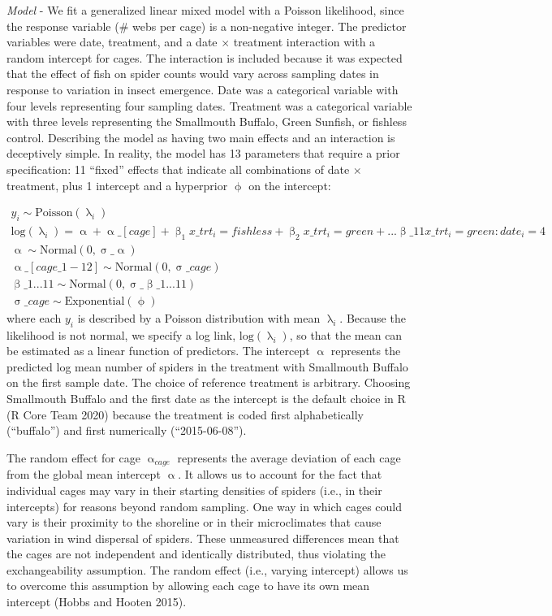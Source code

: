 \documentclass[
  12pt,
]{article}
\begin{document}
\emph{Model} - We fit a generalized linear mixed model with a Poisson
likelihood, since the response variable (\# webs per cage) is a
non-negative integer. The predictor variables were date, treatment, and
a date \(\times\) treatment interaction with a random intercept for
cages. The interaction is included because it was expected that the
effect of fish on spider counts would vary across sampling dates in
response to variation in insect emergence. Date was a categorical
variable with four levels representing four sampling dates. Treatment
was a categorical variable with three levels representing the Smallmouth
Buffalo, Green Sunfish, or fishless control. Describing the model as
having two main effects and an interaction is deceptively simple. In
reality, the model has 13 parameters that require a prior specification:
11 ``fixed'' effects that indicate all combinations of date \(\times\)
treatment, plus 1 intercept and a hyperprior \(\upphi\) on the
intercept:

\begin{gather} y_i \sim \text{Poisson}(\uplambda_i)\\ \text{log} (\uplambda_i) = \upalpha + \upalpha\_{[cage]} +\upbeta_1x\_{trt_i = fishless} + \upbeta_2x\_{trt_i = green} + ...\upbeta\_{11}x\_{trt_i = green:date_i = 4}\\ \upalpha \sim \text{Normal}(0, \upsigma\_{\upalpha})\\ \upalpha\_{[cage\_{1-12}]} \sim \text{Normal}(0, \upsigma\_{cage})\\ \upbeta\_{1...11} \sim \text{Normal}(0, \upsigma\_{\upbeta\_{1...11}})\\ \upsigma\_{cage} \sim \text{Exponential}(\upphi) \end{gather}
where each \(y_i\) is described by a Poisson distribution with mean
\(\uplambda_i\). Because the likelihood is not normal, we specify a log
link, \(\text{log}(\uplambda_i)\), so that the mean can be estimated as
a linear function of predictors. The intercept \(\upalpha\) represents
the predicted log mean number of spiders in the treatment with
Smallmouth Buffalo on the first sample date. The choice of reference
treatment is arbitrary. Choosing Smallmouth Buffalo and the first date
as the intercept is the default choice in R (R Core Team 2020) because
the treatment is coded first alphabetically (``buffalo'') and first
numerically (``2015-06-08'').

The random effect for cage \(\upalpha_{cage}\) represents the average
deviation of each cage from the global mean intercept \(\upalpha\). It
allows us to account for the fact that individual cages may vary in
their starting densities of spiders (i.e., in their intercepts) for
reasons beyond random sampling. One way in which cages could vary is
their proximity to the shoreline or in their microclimates that cause
variation in wind dispersal of spiders. These unmeasured differences
mean that the cages are not independent and identically distributed,
thus violating the exchangeability assumption. The random effect (i.e.,
varying intercept) allows us to overcome this assumption by allowing
each cage to have its own mean intercept (Hobbs and Hooten 2015).
\end{document}

